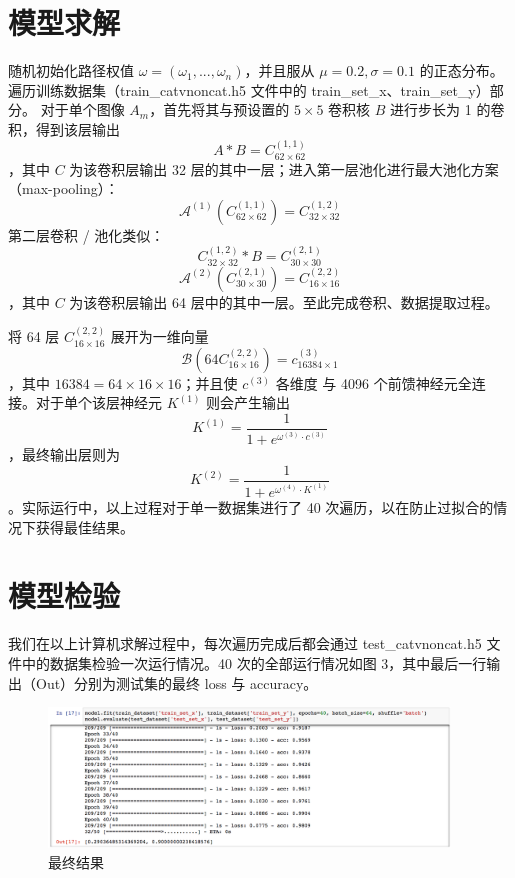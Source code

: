\documentclass[UTF8]{ctexart}
\begin{document}
\section{模型求解}
随机初始化路径权值 $\omega = (\omega_1, ..., \omega_n)$，并且服从 $\mu = 0.2, \sigma = 0.1$ 的正态分布。
遍历训练数据集（train\_catvnoncat.h5 文件中的 train\_set\_x、train\_set\_y）部分。
对于单个图像 $A_m$，首先将其与预设置的 $5 \times 5$ 卷积核 $B$ 进行步长为 1 的卷积，得到该层输出
$$A * B = C^{(1,1)}_{62 \times 62}$$
，其中 $C$ 为该卷积层输出 32 层的其中一层；进入第一层池化进行最大池化方案（max-pooling）：
$$\mathcal{A}^{(1)}(C^{(1,1)}_{62 \times 62}) = C^{(1,2)}_{32 \times 32}$$
第二层卷积 / 池化类似：
$$C^{(1,2)}_{32 \times 32} * B = C^{(2,1)}_{30 \times 30}$$
$$\mathcal{A}^{(2)}(C^{(2,1)}_{30 \times 30}) = C^{(2,2)}_{16 \times 16}$$
，其中 $C$ 为该卷积层输出 64 层中的其中一层。至此完成卷积、数据提取过程。

将 64 层 $C^{(2,2)}_{16 \times 16}$ 展开为一维向量
$$\mathcal{B}(64C^{(2,2)}_{16 \times 16}) = c^{(3)}_{16384 \times 1}$$
，其中 $16384 = 64 \times 16 \times 16$；并且使 $c^{(3)}$ 各维度 与 4096 个前馈神经元全连接。对于单个该层神经元 $K^{(1)}$ 则会产生输出
$$K^{(1)} = \frac{1}{1 + e^{\omega^{(3)} \cdot c^{(3)}}}$$
，最终输出层则为
$$K^{(2)} = \frac{1}{1 + e^{\omega^{(4)} \cdot K^{(1)}}}$$
。实际运行中，以上过程对于单一数据集进行了 40 次遍历，以在防止过拟合的情况下获得最佳结果。

\section{模型检验}
我们在以上计算机求解过程中，每次遍历完成后都会通过 test\_catvnoncat.h5 文件中的数据集检验一次运行情况。40 次的全部运行情况如图 3，其中最后一行输出（Out）分别为测试集的最终 loss 与 accuracy。

\begin{figure}[htbp]
  \centering
  \includegraphics[width=0.95\textwidth]{../reference/result.png}
  \caption{最终结果}
  \label{fig:shapes2}
\end{figure}
\end{document}
